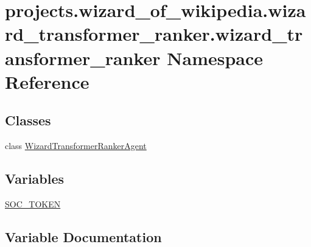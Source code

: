 \hypertarget{namespaceprojects_1_1wizard__of__wikipedia_1_1wizard__transformer__ranker_1_1wizard__transformer__ranker}{}\section{projects.\+wizard\+\_\+of\+\_\+wikipedia.\+wizard\+\_\+transformer\+\_\+ranker.\+wizard\+\_\+transformer\+\_\+ranker Namespace Reference}
\label{namespaceprojects_1_1wizard__of__wikipedia_1_1wizard__transformer__ranker_1_1wizard__transformer__ranker}
\subsection*{Classes}
\begin{DoxyCompactItemize}
\item 
class \hyperlink{classprojects_1_1wizard__of__wikipedia_1_1wizard__transformer__ranker_1_1wizard__transformer__rad02f16524e5e0423aa3e2c69e1330ee1}{Wizard\+Transformer\+Ranker\+Agent}
\end{DoxyCompactItemize}
\subsection*{Variables}
\begin{DoxyCompactItemize}
\item 
\hyperlink{namespaceprojects_1_1wizard__of__wikipedia_1_1wizard__transformer__ranker_1_1wizard__transformer__ranker_abe3df81de330ec6086deead0672d1605}{S\+O\+C\+\_\+\+T\+O\+K\+EN}
\end{DoxyCompactItemize}


\subsection{Variable Documentation}
\mbox{\label{namespaceprojects_1_1wizard__of__wikipedia_1_1wizard__transformer__ranker_1_1wizard__transformer__ranker_abe3df81de330ec6086deead0672d1605}} 
